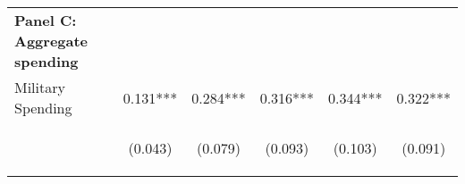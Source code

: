\begin{tabular}{lccccc}
   \multicolumn{1}{l}{\textbf{Panel C: Aggregate spending}} & & & & \\

    Military Spending & 0.131*** & 0.284*** & 0.316*** & 0.344*** & 0.322*** \\
    & \begin{footnotesize}(0.043)\end{footnotesize} & \begin{footnotesize}(0.079)\end{footnotesize} & \begin{footnotesize}(0.093)\end{footnotesize} & \begin{footnotesize}(0.103)\end{footnotesize} & \begin{footnotesize}(0.091)\end{footnotesize} \\
    

\end{tabular}
